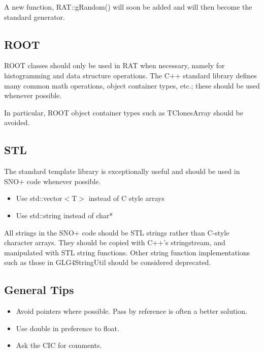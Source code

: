 \documentclass[11pt]{article}
\begin{document}
A new function, RAT::gRandom() will soon be added and will then become the standard generator.

\subsection{ROOT}
ROOT classes should only be used in RAT when necessary, namely for histogramming and data structure operations. The C++ standard library defines many common math operations, object container types, etc.; these should be used whenever possible.

In particular, ROOT object container types such as TClonesArray should be avoided.
\subsection{STL}
The standard template library is exceptionally useful and should be used in SNO+ code whenever possible.
\begin{itemize}
\item Use std::vector$<$T$>$ instead of C style arrays
\item Use std::string instead of char*
\end{itemize}

All strings in the SNO+ code should be STL strings rather than C-style character arrays. They should be copied with C++'s stringstream, and manipulated with STL string functions. Other string function implementations such as those in GLG4StringUtil should be considered deprecated.

\subsection{General Tips}
\begin{itemize}
\item Avoid pointers where possible. Pass by reference is often a better solution.
\item Use double in preference to float.
\item Ask the CIC for comments.
\end{itemize}


\end{document}
